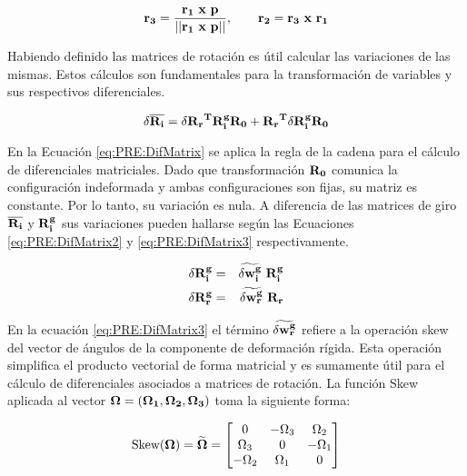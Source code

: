 \begin{equation}\label{Eqn:Corrot:VectorsR}
	\bf{r}_3=\frac{\bf{r_1}~x~\bf{p}}{||\bf{r_1}~x~\bf{p}||},~~~~~~\bf{r_2}=\bf{r_3}~x~\bf{r_1}
\end{equation}


Habiendo definido las matrices de rotación  es útil calcular las variaciones de las mismas. Estos cálculos son fundamentales para la transformación de variables y sus respectivos diferenciales. 

\begin{equation}\label{eq:PRE:DifMatrix}
	\delta \overline{\bf{R_i}}=\delta\bf{R_r}^T\bf{R_i^g}\bf{R_0}+\bf{R_r}^T\delta \bf{R_i^g}\bf{R_0}
\end{equation}

En la Ecuación \eqref{eq:PRE:DifMatrix} se aplica la regla de la cadena para el cálculo de diferenciales matriciales. Dado que transformación $\bf{R_0}$ comunica la configuración indeformada y ambas configuraciones son fijas, su matriz es constante. Por lo tanto, su variación es nula. A diferencia de las matrices de giro $\overline{\bf{R_i}}$ y $ \bf{R_i^g}$ sus variaciones pueden hallarse según las Ecuaciones \eqref{eq:PRE:DifMatrix2} y \eqref{eq:PRE:DifMatrix3} respectivamente.


\begin{eqnarray}
	\label{eq:PRE:DifMatrix2}
	\delta \bf{R_i^g} &=& \widetilde{\delta\bf{w}_i^g}~\bf{R}_i^g\\
	\label{eq:PRE:DifMatrix3}
	\delta \bf{R_r^g} &=& \widetilde{\delta\bf{w}_r^g}~\bf{R}_r
\end{eqnarray}

En la ecuación \eqref{eq:PRE:DifMatrix3} el término $\widetilde{\delta\bf{w}_r^g}$ refiere a la operación skew del vector de ángulos de la componente de deformación rígida. Esta operación simplifica el producto vectorial de forma matricial y es sumamente útil para el cálculo de diferenciales asociados a matrices de rotación. La función \gls{Skew} aplicada al vector $\bf{\Omega}=(\Omega_1,\Omega_2,\Omega_3)$ toma la siguiente forma:

\begin{equation}\label{eq:PRE:Skew}
	\text{Skew}(\bf{\Omega})=\widetilde{\bf{\Omega}}
	= 
	\begin{bmatrix}
		0 &-\Omega_3  &\Omega_2   \\ 
		\Omega_3&0  & -\Omega_1  \\ 
		-\Omega_2  & \Omega_1 & 0
	\end{bmatrix}
\end{equation}

